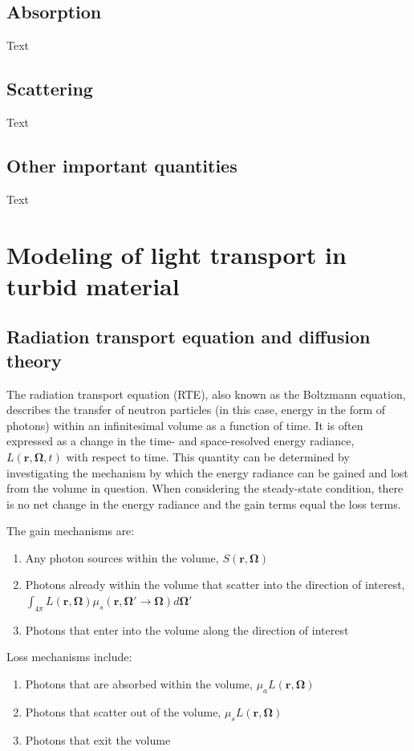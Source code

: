 \subsection{Absorption}
Text

\subsection{Scattering}
Text

\subsection{Other important quantities}
Text

\section{Modeling of light transport in turbid material}
\subsection{Radiation transport equation and diffusion theory}
The radiation transport equation (RTE), also known as the Boltzmann equation, describes the transfer of neutron particles (in this case, energy in the form of photons) within an infinitesimal volume as a function of time.\cite{Duderstadt1976} It is often expressed as a change in the time- and space-resolved energy radiance, $L(\mathbf{r},\mathbf{\Omega},t)$ with respect to time. This quantity can be determined by investigating the mechanism by which the energy radiance can be gained and lost from the volume in question. When considering the steady-state condition, there is no net change in the energy radiance and the gain terms equal the loss terms.

The gain mechanisms are:
\begin{enumerate}
	\item Any photon sources within the volume, $ S(\mathbf{r},\mathbf{\Omega}) $
	\item Photons already within the volume that scatter into the direction of interest,  $\int_{4\pi} L(\mathbf{r},\mathbf{\Omega}) \mu_s(\mathbf{r},\mathbf{\Omega}' \rightarrow \mathbf{\Omega}) d \mathbf{\Omega'} $
	\item Photons that enter into the volume along the direction of interest
\end{enumerate}

Loss mechanisms include:
\begin{enumerate}
	\item Photons that are absorbed within the volume, $ \mu_a L(\mathbf{r},\mathbf{\Omega}) $
	\item Photons that scatter out of the volume, $ \mu_s L(\mathbf{r},\mathbf{\Omega}) $
	\item Photons that exit the volume
\end{enumerate}

